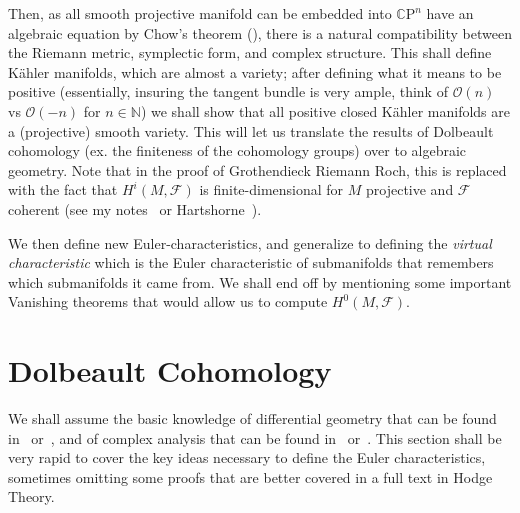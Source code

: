 \documentclass{book}
\newcommand{\N}{{\mathbb{N}}}
\newcommand{\CF}{{\mathcal{F}}}
\newcommand{\CO}{{\mathcal{O}}}
\newcommand{\CP}{{\mathbb{C}\mathrm{P}}}
\begin{document}
Then, as all smooth projective manifold can be embedded into $\CP^n$ have an algebraic equation by Chow's
theorem (\cite{hallGAGATheorems2022}), there is a natural compatibility between the Riemann metric, symplectic
form, and complex structure. This shall define K\"ahler manifolds, which are almost a variety; after
defining what it means to be positive (essentially, insuring the tangent bundle is very ample, think of
$\CO(n)$ vs $\CO(-n)$ for $n \in \N$) we shall show that all positive closed K\"ahler manifolds are a
(projective) smooth variety. This will let us translate the results of Dolbeault cohomology (ex. the
finiteness of the cohomology groups) over to algebraic geometry. Note that in the proof of Grothendieck
Riemann Roch, this is replaced with the fact that $H^i(M, \CF)$ is finite-dimensional for $M$ projective and
$\CF$ coherent (see my notes~\cite{NateAlgGeo} or Hartshorne~\cite{hartshorneAlgebraicGeometry2013}).

We then define new Euler-characteristics, and generalize to defining the \emph{virtual characteristic} which
is the Euler characteristic of submanifolds that remembers which submanifolds it came from. We shall end off by mentioning some important Vanishing theorems that would allow us to compute
$H^0(M, \CF)$.



\section{Dolbeault Cohomology}

We shall assume the basic knowledge of differential geometry that can be found in~\cite{NateDiffGeo}
or~\cite{leeIntroductionSmoothManifolds2003}, and of complex analysis that can be found
in~\cite{NateComplexAnalysis} or~\cite{ahlforsComplexAnalysisIntroduction2007}. This section shall be very
rapid to cover the key ideas necessary to define the Euler characteristics, sometimes omitting some proofs
that are better covered in a full text in Hodge Theory.
\end{document}
